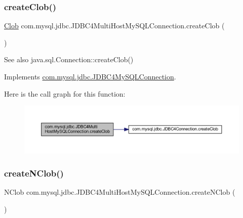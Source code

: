 \subsubsection{\texorpdfstring{create\+Clob()}{createClob()}}
{\footnotesize\ttfamily \mbox{\hyperlink{classcom_1_1mysql_1_1jdbc_1_1_clob}{Clob}} com.\+mysql.\+jdbc.\+J\+D\+B\+C4\+Multi\+Host\+My\+S\+Q\+L\+Connection.\+create\+Clob (\begin{DoxyParamCaption}{ }\end{DoxyParamCaption})}

\begin{DoxySeeAlso}{See also}
java.\+sql.\+Connection\+::create\+Clob() 
\end{DoxySeeAlso}


Implements \mbox{\hyperlink{interfacecom_1_1mysql_1_1jdbc_1_1_j_d_b_c4_my_s_q_l_connection}{com.\+mysql.\+jdbc.\+J\+D\+B\+C4\+My\+S\+Q\+L\+Connection}}.

Here is the call graph for this function\+:
\nopagebreak
\begin{figure}[H]
\begin{center}
\leavevmode
\includegraphics[width=350pt]{classcom_1_1mysql_1_1jdbc_1_1_j_d_b_c4_multi_host_my_s_q_l_connection_a7cb5c2e81f0ede111146720c6d1bc6ba_cgraph}
\end{center}
\end{figure}
\mbox{\label{classcom_1_1mysql_1_1jdbc_1_1_j_d_b_c4_multi_host_my_s_q_l_connection_a1d465e43c68df080280c241cf3b29c9c}} 
\subsubsection{\texorpdfstring{create\+N\+Clob()}{createNClob()}}
{\footnotesize\ttfamily N\+Clob com.\+mysql.\+jdbc.\+J\+D\+B\+C4\+Multi\+Host\+My\+S\+Q\+L\+Connection.\+create\+N\+Clob (\begin{DoxyParamCaption}{ }\end{DoxyParamCaption})}

